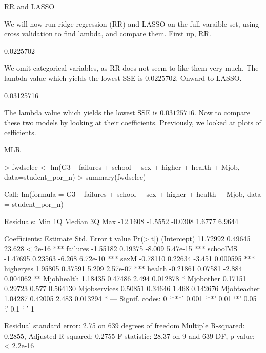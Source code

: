 \documentclass{article}
\begin{document}
RR and LASSO

We will now run ridge regression (RR) and LASSO on the full varaible set, using cross validation to find lambda, and compare them. First up, RR. 

\begin{Schunk}
\begin{Soutput}
[1] 0.0225702
\end{Soutput}
\end{Schunk}

We omit categorical variables, as RR does not seem to like them very much. The lambda value which yields the lowest SSE is $0.0225702$. Onward to LASSO. 

\begin{Schunk}
\begin{Soutput}
[1] 0.03125716
\end{Soutput}
\end{Schunk}

The lambda value which yields the lowest SSE is $0.03125716$. Now to compare these two models by looking at their coefficients. Previously, we looked at plots of cefficients.

MLR 

\begin{Schunk}
\begin{Sinput}
> fwdselec <- lm(G3 ~ failures + school + sex + higher + health + Mjob, data=student_por_n)
> summary(fwdselec)
\end{Sinput}
\begin{Soutput}
Call:
lm(formula = G3 ~ failures + school + sex + higher + health + 
    Mjob, data = student_por_n)

Residuals:
     Min       1Q   Median       3Q      Max 
-12.1608  -1.5552  -0.0308   1.6777   6.9644 

Coefficients:
             Estimate Std. Error t value Pr(>|t|)    
(Intercept)  11.72992    0.49645  23.628  < 2e-16 ***
failures     -1.55182    0.19375  -8.009 5.47e-15 ***
schoolMS     -1.47695    0.23563  -6.268 6.72e-10 ***
sexM         -0.78110    0.22634  -3.451 0.000595 ***
higheryes     1.95805    0.37591   5.209 2.57e-07 ***
health       -0.21861    0.07581  -2.884 0.004062 ** 
Mjobhealth    1.18435    0.47486   2.494 0.012878 *  
Mjobother     0.17151    0.29723   0.577 0.564130    
Mjobservices  0.50851    0.34646   1.468 0.142676    
Mjobteacher   1.04287    0.42005   2.483 0.013294 *  
---
Signif. codes:  0 ‘***’ 0.001 ‘**’ 0.01 ‘*’ 0.05 ‘.’ 0.1 ‘ ’ 1

Residual standard error: 2.75 on 639 degrees of freedom
Multiple R-squared:  0.2855,	Adjusted R-squared:  0.2755 
F-statistic: 28.37 on 9 and 639 DF,  p-value: < 2.2e-16
\end{Soutput}
\end{Schunk}
\end{document}
